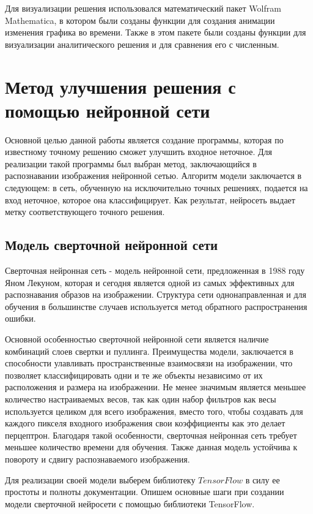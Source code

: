 \documentclass[12pt, a4paper]{article}
\begin{document}
 Для визуализации решения использовался математический пакет Wolfram Mathematica, в котором были созданы функции для создания анимации изменения графика во времени. Также в этом пакете были созданы функции для визуализации аналитического решения и для сравнения его с численным.

\section{Метод улучшения решения с помощью нейронной сети}

Основной целью данной работы является создание программы, которая по известному точному решению сможет улучшить входное неточное. Для реализации такой программы был выбран метод, заключающийся в распознавании изображения нейронной сетью. Алгоритм модели заключается в следующем: в сеть, обученную на исключительно точных решениях, подается на вход неточное, которое она классифицирует. Как результат, нейросеть выдает метку соответствующего точного решения.

\subsection{Модель сверточной нейронной сети}

Сверточная нейронная сеть - модель нейронной сети, предложенная в 1988 году Яном Лекуном, которая и сегодня является одной из самых эффективных для распознавания образов на изображении. Структура сети однонаправленная и для обучения в большинстве случаев используется метод обратного распространения ошибки. \cite{2}

Основной особенностью сверточной нейронной сети является наличие комбинаций слоев свертки и пуллинга. Преимущества модели, заключается в способности улавливать пространственные взаимосвязи на изображении, что позволяет классифицировать одни и те же объекты независимо от их расположения и размера на изображении. Не менее значимым является меньшее количество настраиваемых весов, так как один набор фильтров как весы используется целиком для всего изображения, вместо того, чтобы создавать для каждого пикселя входного изображения свои коэффициенты как это делает перцептрон. Благодаря такой особенности, сверточная нейронная сеть требует меньшее количество времени для обучения. Также данная модель устойчива к повороту и сдвигу распознаваемого изображения. 

Для реализации своей модели выберем библиотеку $TensorFlow$ в силу ее простоты и полноты документации. Опишем основные шаги при создании модели сверточной нейросети с помощью библиотеки TensorFlow. 
\end{document}

